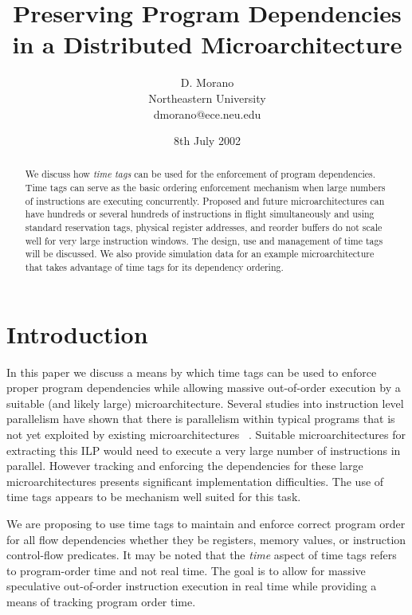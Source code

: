 \documentclass[10pt,dvips]{article}
\begin{document}
%
%
\title{Preserving Program Dependencies in a Distributed Microarchitecture}
%
%
\author{
D. Morano\\
Northeastern University\\
dmorano@ece.neu.edu
}
%
%
\date{8th July 2002}
%
\maketitle
%
%
%
\begin{abstract}
We discuss how {\em time tags} can be used for the enforcement of
program dependencies.
Time tags can serve as the basic ordering enforcement mechanism
when large numbers of instructions are executing concurrently.
Proposed and future microarchitectures can have hundreds or several hundreds
of instructions in flight simultaneously and using standard 
reservation
tags, physical register addresses, and reorder buffers do not scale
well for very large instruction windows.
The design, use and management of time tags will
be discussed.  
We also provide simulation data for an example microarchitecture
that takes advantage of time tags for its dependency ordering.
\end{abstract}
%
%
\section{Introduction}
%
In this paper we discuss a means by which time tags can be used
to enforce proper program dependencies while allowing
massive out-of-order execution by a suitable (and likely large)
microarchitecture.
Several studies into instruction level parallelism
have shown that there is parallelism within
typical programs that is not yet exploited by existing
microarchitectures ~\cite{Gon97,Lam92,Uht95}.  
Suitable microarchitectures for extracting this ILP would need to
execute a very large number of instructions in parallel.
However tracking and enforcing the dependencies for these
large microarchitectures presents significant implementation
difficulties.  The use of time tags appears to be mechanism well suited
for this task.

We are proposing to use time tags to maintain 
and enforce correct program order for all flow dependencies whether
they be registers, memory values, or instruction control-flow predicates.
It may be noted that the \textit{time} aspect of time tags
refers to program-order time and not real time.
The goal is to allow for massive speculative out-of-order 
instruction execution
in real time while providing a means of tracking program order
time.
\end{document}
